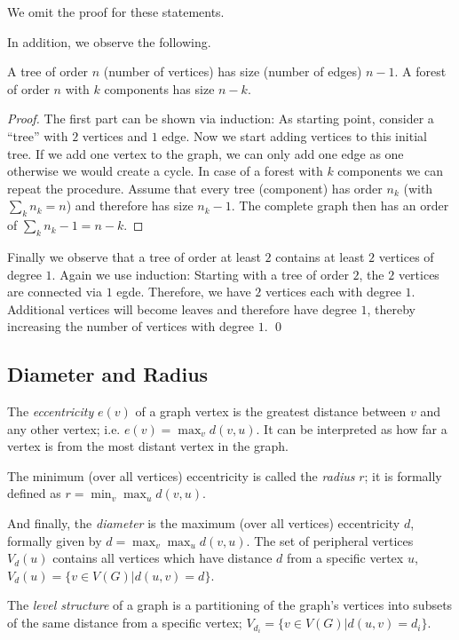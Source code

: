 We omit the proof for these statements.

In addition, we observe the following.

\begin{theorem}
  A tree of order $n$ (number of vertices) has size (number of edges) $n-1$. A forest of order $n$ with $k$ components has size $n-k$.
\end{theorem}

\begin{proof}
The first part can be shown via induction: As starting point, consider a ``tree'' with $2$ vertices and $1$ edge. Now we start adding vertices to this initial tree. If we add one vertex to the graph, we can only add one edge as one otherwise we would create a cycle. In case of a forest with $k$ components we can repeat the procedure. Assume that every tree (component) has order $n_k$ (with $\sum_k n_k = n$) and therefore has size $n_k - 1$. The complete graph then has an order of $\sum_k n_k - 1 = n-k$.
\end{proof}

Finally we observe that a tree of order at least $2$ contains at least $2$ vertices of degree $1$. Again we use induction: Starting with a tree of order $2$, the $2$ vertices are connected via $1$ egde. Therefore, we have $2$ vertices each with degree $1$. Additional vertices will become leaves and therefore have degree $1$, thereby increasing the number of vertices with degree $1$. \qed

\subsection{Diameter and Radius}

The \emph{eccentricity} $e(v)$ of a graph vertex is the greatest distance between $v$ and any other vertex; i.e. $e(v) = \max_v d(v,u)$. It can be interpreted as how far a vertex is from the most distant vertex in the graph.

The minimum (over all vertices) eccentricity is called the \emph{radius} $r$; it is formally defined as $r = \min_v \max_u d(v,u)$. 

And finally, the \emph{diameter} is the maximum (over all vertices) eccentricity $d$, formally given by $d = \max_v \max_u d(v,u)$. The set of peripheral vertices $V_d(u)$ contains all vertices which have distance $d$ from a specific vertex $u$, $V_d(u) = \{v \in V(G) | d(u,v) = d\}$.

The \emph{level structure} of a graph is a partitioning of the graph's vertices into subsets of the same distance from a specific vertex; $V_{d_i} = \{v \in V(G) | d(u,v) = d_i\}$.

